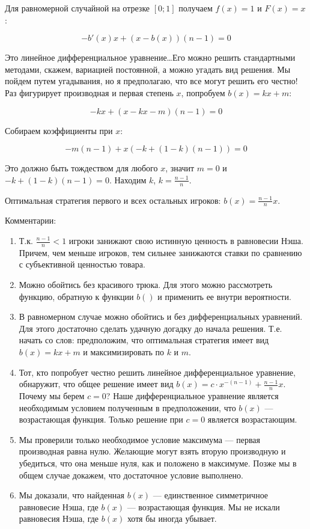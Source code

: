 \begin{enumerate}
Для равномерной случайной на отрезке $ [0;1] $ получаем $ f(x)=1 $ и $ F(x)=x $:

\begin{equation}
-b'(x)x+(x-b(x))(n-1)=0
\end{equation}

Это линейное дифференциальное уравнение\ldots Его можно решить стандартными методами, скажем, вариацией постоянной, а можно угадать вид решения. Мы пойдем путем угадывания, но я предполагаю, что все могут решить его честно! Раз фигурирует производная и первая степень $ x $, попробуем $b(x)=kx+m $:

\begin{equation}
-kx+(x-kx-m)(n-1)=0
\end{equation}

Собираем коэффициенты при $ x $:

\begin{equation}
-m(n-1)+x(-k+(1-k)(n-1))=0
\end{equation}

Это должно быть тождеством для любого $ x $, значит $ m=0 $ и  $-k+(1-k)(n-1)=0$. Находим $ k $, $ k=\frac{n-1}{n} $.

Оптимальная стратегия первого и всех остальных игроков: $ b(x)=\frac{n-1}{n}x $.


Комментарии:

\begin{enumerate}
\item Т.к. $ \frac{n-1}{n}<1 $ игроки занижают свою истинную ценность в равновесии Нэша. Причем, чем меньше игроков, тем сильнее занижаются ставки по сравнению с субъективной ценностью товара.
\item Можно обойтись без красивого трюка. Для этого можно рассмотреть функцию, обратную к функции $ b() $ и применить ее внутри вероятности. 
\item В равномерном случае можно обойтись и без дифференциальных уравнений. Для этого достаточно сделать удачную догадку до начала решения. Т.е. начать со слов: предположим, что оптимальная стратегия имеет вид $ b(x)=kx+m $ и максимизировать по $ k $ и $ m $.
\item Тот, кто попробует честно решить линейное дифференциальное уравнение, обнаружит, что общее решение имеет вид $ b(x)=c\cdot x^{-(n-1)}+\frac{n-1}{n}x $. Почему мы берем $ c=0 $? Наше дифференциальное уравнение является необходимым условием полученным в предположении, что $ b(x) $ --- возрастающая функция. Только решение при $ c=0 $ является возрастающим. 
\item Мы проверили только необходимое условие максимума --- первая производная равна нулю. Желающие могут взять вторую производную и убедиться, что она меньше нуля, как и положено в максимуме. Позже мы в общем случае докажем, что достаточное условие выполнено.
\item Мы доказали, что найденная $ b(x) $ --- единственное симметричное равновесие Нэша, где $ b(x) $ --- возрастающая функция. Мы не искали равновесия Нэша, где $ b(x) $ хотя бы иногда убывает.
\end{enumerate}



\end{enumerate}
